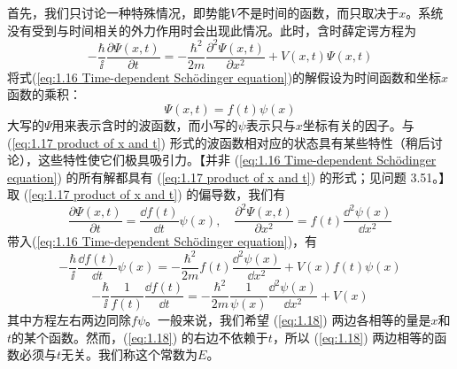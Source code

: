 	首先，我们只讨论一种特殊情况，即势能$V$不是时间的函数，而只取决于$x$。系统没有受到与时间相关的外力作用时会出现此情况。此时，含时薛定谔方程为
	\begin{equation}
		-\frac{\hbar}{\ii}\frac{\partial \Psi \left(x,t\right)}{\partial t}= -\frac{\hbar^2}{2m}\frac{\partial^2 \Psi \left(x,t\right)}{\partial x^2}+ V\left(x,t\right)\Psi\left(x,t\right)
		\label{eq:1.16 Time-dependent Schödinger equation}
	\end{equation}
	将式(\ref{eq:1.16 Time-dependent Schödinger equation})的解假设为时间函数和坐标$x$函数的乘积：
	\begin{equation}
		\boxed{\Psi\left(x,t\right)=f\left(t\right)\psi\left(x\right)}
		\label{eq:1.17 product of x and t}
	\end{equation}
	大写的$\Psi$用来表示含时的波函数，而小写的$\psi$表示只与$x$坐标有关的因子。与 (\ref{eq:1.17 product of x and t}) 形式的波函数相对应的状态具有某些特性（稍后讨论），这些特性使它们极具吸引力。【并非 (\ref{eq:1.16 Time-dependent Schödinger equation}) 的所有解都具有 (\ref{eq:1.17 product of x and t}) 的形式；见问题 3.51。】取 (\ref{eq:1.17 product of x and t}) 的偏导数，我们有
	\begin{equation*}
		\frac{\partial \Psi\left(x,t\right)}{\partial t} = \frac{\dd f\left(t\right)}{\dd t} \psi\left(x\right), \quad \frac{\partial^2 \Psi \left(x,t\right)}{\partial x^2}= f\left(t\right) \frac{\dd ^2\psi\left(x\right)}{\dd x^2}
	\end{equation*}
	带入(\ref{eq:1.16 Time-dependent Schödinger equation})，有
	\begin{equation*}
		-\frac{\hbar}{\ii}\frac{\dd f\left(t\right)}{\dd t}\psi\left(x\right)=-\frac{\hbar^2}{2m}f\left(t\right)\frac{\dd ^2\psi\left(x\right)}{\dd x^2}+V\left(x\right)f\left(t\right)\psi\left(x\right)
	\end{equation*}
	\begin{equation}
			-\frac{\hbar}{\ii}\frac{1}{f\left(t\right)}\frac{\dd f\left(t\right)}{\dd t}=-\frac{\hbar^2}{2m}\frac{1}{\psi\left(x\right)}\frac{\dd ^2\psi\left(x\right)}{\dd x^2}+V\left(x\right)
			\label{eq:1.18}
	\end{equation}
	其中方程左右两边同除$f\psi$。一般来说，我们希望 (\ref{eq:1.18}) 两边各相等的量是$x$和$t$的某个函数。然而，(\ref{eq:1.18}) 的右边不依赖于$t$，所以 (\ref{eq:1.18}) 两边相等的函数必须与$t$无关。我们称这个常数为$E$。

